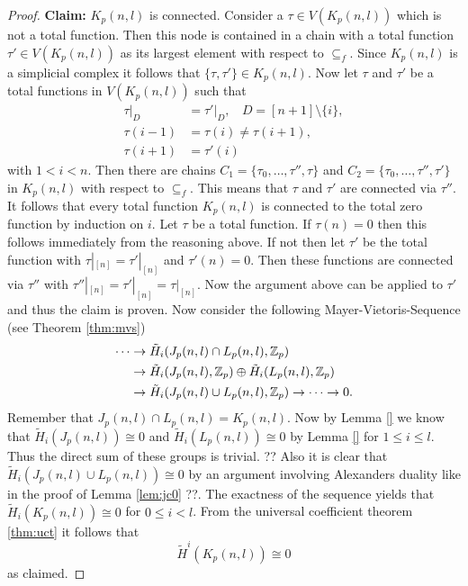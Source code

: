 \begin{proof}
  \textbf{Claim:} $K_p(n,l)$ is connected. Consider a $\tau \in V(K_p(n,l))$ which is not a total function. Then this node is contained in a chain with a total function $\tau' \in V(K_p(n,l))$ as its largest element with respect to $\subseteq_f$. Since $K_p(n,l)$ is a simplicial complex it follows that $\{\tau, \tau'\} \in K_p(n,l)$.
  Now let $\tau$ and $\tau'$ be a total functions in $V(K_p(n,l))$ such that
  \begin{align*}
    \tau|_D &= \tau'|_D, \:\:\:\: D = [n+1]\setminus \{i\}, \\
    \tau(i-1) &= \tau(i) \neq \tau(i+1), \\
    \tau(i+1) &= \tau'(i)
  \end{align*}
  with $1 < i < n$.
  Then there are chains $C_1 = \{\tau_0, \ldots, \tau'', \tau\}$ and $C_2 = \{\tau_0, \ldots, \tau'', \tau' \}$ in $K_p(n,l)$ with respect to $\subseteq_f$. This means that $\tau$ and $\tau'$ are connected via $\tau''$.
  It follows that every total function $K_p(n,l)$ is connected to the total zero function by induction on $i$. Let $\tau$ be a total function. If $\tau(n) = 0$ then this follows immediately from the reasoning above. If not then let $\tau'$ be the total function with $\tau|_{[n]} = \tau'|_{[n]}$ and $\tau'(n) = 0$. Then these functions are connected via $\tau''$ with $\tau''|_{[n]} = \tau'|_{[n]} = \tau|_{[n]}$. Now the argument above can be applied to $\tau'$ and thus the claim is proven.
  Now consider the following Mayer-Vietoris-Sequence (see Theorem \ref{thm:mvs})
  \begin{align*}
    \label{eq:mayvietk}
    \cdots &\to \tilde{H}_i(J_p(n,l) \cap L_p(n,l), \mathbb{Z}_p) \\ &\to \tilde{H}_i(J_p(n,l), \mathbb{Z}_p) \oplus \tilde{H}_i(L_p(n,l), \mathbb{Z}_p) \\ &\to \tilde{H}_i(J_p(n,l) \cup L_p(n,l), \mathbb{Z}_p) \to \cdots \to 0.
  \end{align*}
  Remember that $J_p(n,l) \cap L_p(n,l) = K_p(n,l)$. Now by Lemma \ref{} we know that $\tilde{H}_i(J_p(n,l)) \cong 0$ and $\tilde{H}_i(L_p(n,l)) \cong 0$ by Lemma \ref{} for $1 \leq i \leq l$. Thus the direct sum of these groups is trivial. ?? Also it is clear that $\tilde{H}_i(J_p(n,l) \cup L_p(n,l)) \cong 0$ by an argument involving Alexanders duality like in the proof of Lemma \ref{lem:jc0} ??. The exactness of the sequence yields that $\tilde{H}_i(K_p(n,l)) \cong 0$ for $0 \leq i < l$. From the universal coefficient theorem \ref{thm:uct} it follows that \[\tilde{H}^i(K_p(n,l)) \cong 0\] as claimed.
\end{proof}

